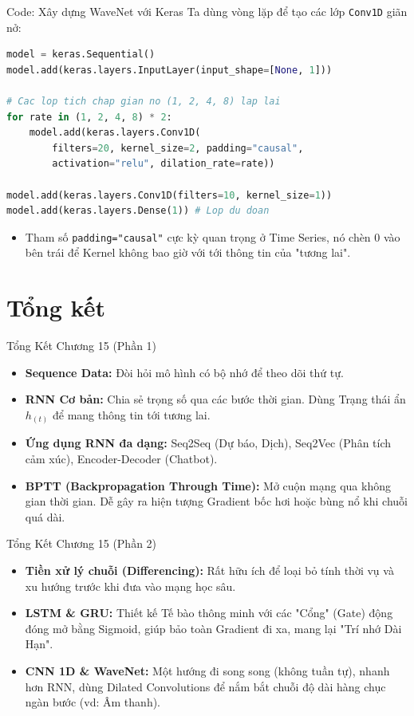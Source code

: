 \documentclass[aspectratio=169]{beamer}
\begin{document}
\begin{frame}[fragile]{Code: Xây dựng WaveNet với Keras}
    Ta dùng vòng lặp để tạo các lớp \texttt{Conv1D} giãn nở:
\begin{lstlisting}[language=Python]
model = keras.Sequential()
model.add(keras.layers.InputLayer(input_shape=[None, 1]))

# Cac lop tich chap gian no (1, 2, 4, 8) lap lai
for rate in (1, 2, 4, 8) * 2:
    model.add(keras.layers.Conv1D(
        filters=20, kernel_size=2, padding="causal",
        activation="relu", dilation_rate=rate))

model.add(keras.layers.Conv1D(filters=10, kernel_size=1))
model.add(keras.layers.Dense(1)) # Lop du doan
\end{lstlisting}
    \begin{itemize}
        \item Tham số \texttt{padding="causal"} cực kỳ quan trọng ở Time Series, nó chèn 0 vào bên trái để Kernel không bao giờ với tới thông tin của "tương lai".
    \end{itemize}
\end{frame}

\section{Tổng kết}

\begin{frame}{Tổng Kết Chương 15 (Phần 1)}
    \begin{itemize}
        \item \textbf{Sequence Data:} Đòi hỏi mô hình có bộ nhớ để theo dõi thứ tự.
        \item \textbf{RNN Cơ bản:} Chia sẻ trọng số qua các bước thời gian. Dùng Trạng thái ẩn $h_{(t)}$ để mang thông tin tới tương lai.
        \item \textbf{Ứng dụng RNN đa dạng:} Seq2Seq (Dự báo, Dịch), Seq2Vec (Phân tích cảm xúc), Encoder-Decoder (Chatbot).
        \item \textbf{BPTT (Backpropagation Through Time):} Mở cuộn mạng qua không gian thời gian. Dễ gây ra hiện tượng Gradient bốc hơi hoặc bùng nổ khi chuỗi quá dài.
    \end{itemize}
\end{frame}

\begin{frame}{Tổng Kết Chương 15 (Phần 2)}
    \begin{itemize}
        \item \textbf{Tiền xử lý chuỗi (Differencing):} Rất hữu ích để loại bỏ tính thời vụ và xu hướng trước khi đưa vào mạng học sâu.
        \item \textbf{LSTM \& GRU:} Thiết kế Tế bào thông minh với các "Cổng" (Gate) động đóng mở bằng Sigmoid, giúp bảo toàn Gradient đi xa, mang lại "Trí nhớ Dài Hạn".
        \item \textbf{CNN 1D \& WaveNet:} Một hướng đi song song (không tuần tự), nhanh hơn RNN, dùng Dilated Convolutions để nắm bắt chuỗi độ dài hàng chục ngàn bước (vd: Âm thanh).
    \end{itemize}
\end{frame}
\end{document}
